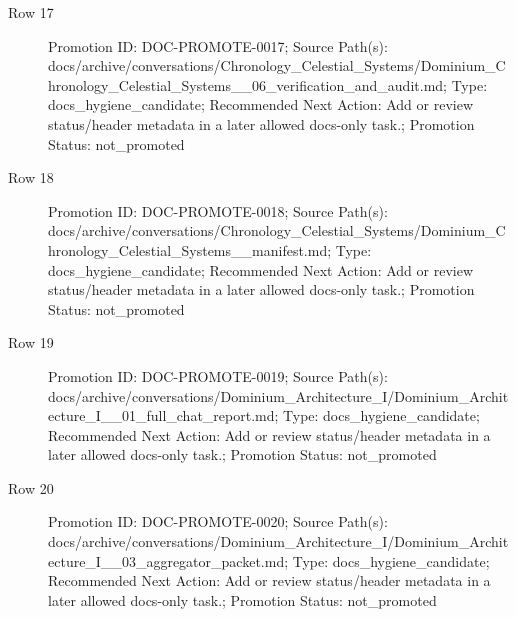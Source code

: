 \documentclass[10.5pt,a4paper,openany]{book}
\begin{document}
\begin{description}
\item[Row 17] Promotion ID: DOC-\allowbreak{}PROMOTE-\allowbreak{}0017; Source Path(s): docs/\allowbreak{}archive/\allowbreak{}conversations/\allowbreak{}Chronology\_\allowbreak{}Celestial\_\allowbreak{}Systems/\allowbreak{}Dominium\_\allowbreak{}Chronology\_\allowbreak{}Celestial\_\allowbreak{}Systems\_\allowbreak{}\_\allowbreak{}06\_\allowbreak{}verification\_\allowbreak{}and\_\allowbreak{}audit.\allowbreak{}md; Type: docs\_\allowbreak{}hygiene\_\allowbreak{}candidate; Recommended Next Action: Add or review status/\allowbreak{}header metadata in a later allowed docs-\allowbreak{}only task.\allowbreak{}; Promotion Status: not\_\allowbreak{}promoted
\item[Row 18] Promotion ID: DOC-\allowbreak{}PROMOTE-\allowbreak{}0018; Source Path(s): docs/\allowbreak{}archive/\allowbreak{}conversations/\allowbreak{}Chronology\_\allowbreak{}Celestial\_\allowbreak{}Systems/\allowbreak{}Dominium\_\allowbreak{}Chronology\_\allowbreak{}Celestial\_\allowbreak{}Systems\_\allowbreak{}\_\allowbreak{}manifest.\allowbreak{}md; Type: docs\_\allowbreak{}hygiene\_\allowbreak{}candidate; Recommended Next Action: Add or review status/\allowbreak{}header metadata in a later allowed docs-\allowbreak{}only task.\allowbreak{}; Promotion Status: not\_\allowbreak{}promoted
\item[Row 19] Promotion ID: DOC-\allowbreak{}PROMOTE-\allowbreak{}0019; Source Path(s): docs/\allowbreak{}archive/\allowbreak{}conversations/\allowbreak{}Dominium\_\allowbreak{}Architecture\_\allowbreak{}I/\allowbreak{}Dominium\_\allowbreak{}Architecture\_\allowbreak{}I\_\allowbreak{}\_\allowbreak{}01\_\allowbreak{}full\_\allowbreak{}chat\_\allowbreak{}report.\allowbreak{}md; Type: docs\_\allowbreak{}hygiene\_\allowbreak{}candidate; Recommended Next Action: Add or review status/\allowbreak{}header metadata in a later allowed docs-\allowbreak{}only task.\allowbreak{}; Promotion Status: not\_\allowbreak{}promoted
\item[Row 20] Promotion ID: DOC-\allowbreak{}PROMOTE-\allowbreak{}0020; Source Path(s): docs/\allowbreak{}archive/\allowbreak{}conversations/\allowbreak{}Dominium\_\allowbreak{}Architecture\_\allowbreak{}I/\allowbreak{}Dominium\_\allowbreak{}Architecture\_\allowbreak{}I\_\allowbreak{}\_\allowbreak{}03\_\allowbreak{}aggregator\_\allowbreak{}packet.\allowbreak{}md; Type: docs\_\allowbreak{}hygiene\_\allowbreak{}candidate; Recommended Next Action: Add or review status/\allowbreak{}header metadata in a later allowed docs-\allowbreak{}only task.\allowbreak{}; Promotion Status: not\_\allowbreak{}promoted

\end{description}
\end{document}
